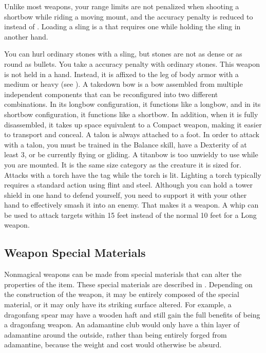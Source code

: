      Unlike most  weapons, your range limits are not penalized when shooting a shortbow while riding a moving mount, and the accuracy penalty is reduced to  instead of .
     Loading a sling is a  that requires one  while holding the sling in another hand.
    \par You can hurl ordinary stones with a sling, but stones are not as dense or as round as bullets. You take a  accuracy penalty with ordinary stones.
     This weapon is not held in a hand.
    Instead, it is affixed to the leg of body armor with a medium or heavy  (see ).
     A takedown bow is a bow assembled from multiple independent components that can be reconfigured into two different combinations.
    In its longbow configuration, it functions like a longbow, and in its shortbow configuration, it functions like a shortbow.
    In addition, when it is fully disassembled, it takes up space equivalent to a Compact weapon, making it easier to transport and conceal.
     A talon is always attached to a foot.
    In order to attack with a talon, you must be trained in the Balance skill, have a Dexterity of at least 3, or be currently flying or gliding.
     A titanbow is too unwieldy to use while you are mounted.
    It is the same size category as the creature it is sized for.
     Attacks with a torch have the \atFire tag while the torch is lit.
    Lighting a torch typically requires a standard action using flint and steel.
     Although you can hold a tower shield in one hand to defend yourself, you need to support it with your other hand to effectively smash it into an enemy.
    That makes it a  weapon.
     A whip can be used to attack targets within 15 feet instead of the normal 10 feet for a Long weapon.

  \subsection{Weapon Special Materials}\label{Weapon Special Materials}
    Nonmagical weapons can be made from special materials that can alter the properties of the item.
    These special materials are described in .
    Depending on the construction of the weapon, it may be entirely composed of the special material, or it may only have its striking surface altered.
    For example, a dragonfang spear may have a wooden haft and still gain the full benefits of being a dragonfang weapon.
    An adamantine club would only have a thin layer of adamantine around the outside, rather than being entirely forged from adamantine, because the weight and cost would otherwise be absurd.

